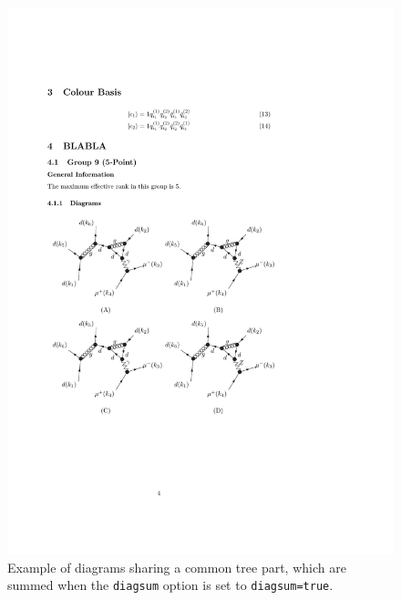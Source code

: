 \documentclass[11pt,a4paper]{refrep}
\begin{document}
\begin{figure}[htb]
\centering
\includegraphics[width=1.0\textwidth]{diagsum1.pdf}
\caption{Example of diagrams sharing a common tree part, which are 
summed when the {\tt diagsum} option is set to {\tt diagsum=true}.}
\label{fig:diagsum_tree}
\end{figure} 
\end{document}
